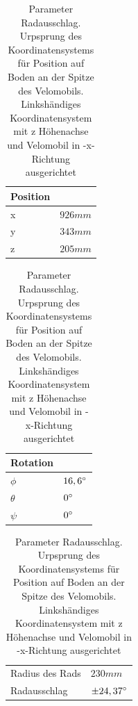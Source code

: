\begin{table}[h]
	\begin{tabularx}{.5\textwidth}{ll}\hline
		
		Position & \\
		\hline
		x &	$926mm$ \\
		y &	$343mm$ \\
		z &	$205mm$	\\
	\end{tabularx}
	\begin{tabularx}{.5\textwidth}{ll}\hline
		Rotation & \\ \hline
		$\phi$ & $16,6\degree$ \\
		$\theta$ & $0\degree$ \\
		$\psi$ & $0\degree$ \\
	\end{tabularx}
	\begin{tabularx}{.5\linewidth}{ll}
		Radius des Rads & $230mm$ \\
		Radausschlag & $\pm24,37\degree$\\
		
	\end{tabularx}

\label{tab:wheel_params}
\caption{Parameter Radausschlag. Urpsprung des Koordinatensystems für Position auf Boden an der Spitze des Velomobils. Linkshändiges Koordinatensystem mit z Höhenachse und Velomobil in -x-Richtung ausgerichtet}
\end{table}

